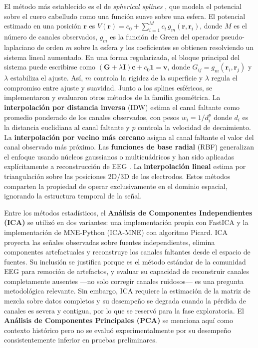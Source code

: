 El método más establecido es el de \textit{spherical splines} \cite{perrin1989}, que modela el potencial sobre el cuero cabelludo como una función suave sobre una esfera. El potencial estimado en una posición $\mathbf{r}$ es $\hat{V}(\mathbf{r}) = c_0 + \sum_{i=1}^{M} c_i \, g_m(\mathbf{r}, \mathbf{r}_i)$, donde $M$ es el número de canales observados, $g_m$ es la función de Green del operador pseudo-laplaciano de orden $m$ sobre la esfera y los coeficientes se obtienen resolviendo un sistema lineal aumentado. En una forma regularizada, el bloque principal del sistema puede escribirse como $(\mathbf{G} + \lambda \mathbf{I})\mathbf{c} + c_0\mathbf{1}=\mathbf{v}$, donde $G_{ij}=g_m(\mathbf{r}_i,\mathbf{r}_j)$ y $\lambda$ estabiliza el ajuste. Así, $m$ controla la rigidez de la superficie y $\lambda$ regula el compromiso entre ajuste y suavidad.
Junto a los splines esféricos, se implementaron y evaluaron otros métodos de la familia geométrica. La \textbf{interpolación por distancia inversa} (IDW) estima el canal faltante como promedio ponderado de los canales observados, con pesos $w_i = 1/d_i^p$ donde $d_i$ es la distancia euclidiana al canal faltante y $p$ controla la velocidad de decaimiento. La \textbf{interpolación por vecino más cercano} asigna al canal faltante el valor del canal observado más próximo. Las \textbf{funciones de base radial} (RBF) generalizan el enfoque usando núcleos gaussianos o multicuádricos y han sido aplicadas explícitamente a reconstrucción de EEG \cite{jager2016rbf}. La \textbf{interpolación lineal} estima por triangulación sobre las posiciones 2D/3D de los electrodos. Estos métodos comparten la propiedad de operar exclusivamente en el dominio espacial, ignorando la estructura temporal de la señal.

Entre los métodos estadísticos, el \textbf{Análisis de Componentes Independientes (ICA)} \cite{jung2001imaging} se utilizó en dos variantes: una implementación propia con FastICA y la implementación de MNE-Python (ICA-MNE) con algoritmo Picard. ICA proyecta las señales observadas sobre fuentes independientes, elimina componentes artefactuales y reconstruye los canales faltantes desde el espacio de fuentes. Su inclusión se justifica porque es el método estándar de la comunidad EEG para remoción de artefactos, y evaluar su capacidad de reconstruir canales completamente ausentes —no solo corregir canales ruidosos— es una pregunta metodológica relevante. Sin embargo, ICA requiere la estimación de la matriz de mezcla sobre datos completos y su desempeño se degrada cuando la pérdida de canales es severa y contigua, por lo que se reservó para la fase exploratoria. El \textbf{Análisis de Componentes Principales (PCA)} se menciona aquí como contexto histórico pero no se evaluó experimentalmente por su desempeño consistentemente inferior en pruebas preliminares.
